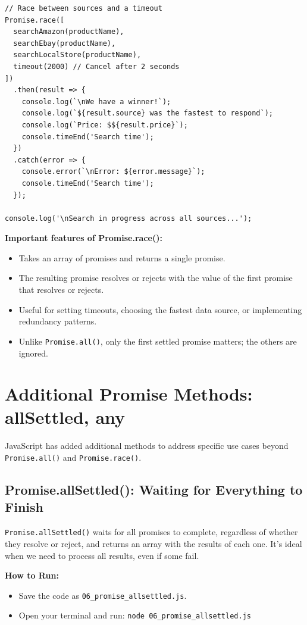 \documentclass[12pt,letterpaper]{article}
\newenvironment{macterminal}{%
    \begin{mdframed}[
        linecolor=terminalFrame,
        backgroundcolor=terminalBg,
        roundcorner=5pt,
        skipabove=5pt,
        skipbelow=5pt,
        linewidth=1pt,
        innertopmargin=5pt,
        frametitle={%
            \tikz[baseline=(current bounding box.east), outer sep=0pt]{
                \fill[red!80!black] (0,0) circle (5pt);
                \fill[yellow!80!black] (0.7,0) circle (5pt);
                \fill[green!70!black] (1.4,0) circle (5pt);
            }
        },
        frametitlealignment=\raggedright,
        frametitleaboveskip=8pt,
        frametitlebelowskip=0pt,
    ]
}{%
    \end{mdframed}%
}
\begin{document}
\begin{macterminal}
\begin{lstlisting}
// Race between sources and a timeout
Promise.race([
  searchAmazon(productName),
  searchEbay(productName),
  searchLocalStore(productName),
  timeout(2000) // Cancel after 2 seconds
])
  .then(result => {
    console.log(`\nWe have a winner!`);
    console.log(`${result.source} was the fastest to respond`);
    console.log(`Price: $${result.price}`);
    console.timeEnd('Search time');
  })
  .catch(error => {
    console.error(`\nError: ${error.message}`);
    console.timeEnd('Search time');
  });

console.log('\nSearch in progress across all sources...');
\end{lstlisting}
\end{macterminal}

\textbf{Important features of Promise.race():}
\begin{itemize}
    \item Takes an array of promises and returns a single promise.
    \item The resulting promise resolves or rejects with the value of the first promise that resolves or rejects.
    \item Useful for setting timeouts, choosing the fastest data source, or implementing redundancy patterns.
    \item Unlike \texttt{\textcolor{accentColor}{Promise.all()}}, only the first settled promise matters; the others are ignored.
\end{itemize}

\section{Additional Promise Methods: allSettled, any}

JavaScript has added additional methods to address specific use cases beyond \texttt{\textcolor{accentColor}{Promise.all()}} and \texttt{\textcolor{accentColor}{Promise.race()}}.

\subsection{Promise.allSettled(): Waiting for Everything to Finish}

\texttt{\textcolor{accentColor}{Promise.allSettled()}} waits for all promises to complete, regardless of whether they resolve or reject, and returns an array with the results of each one. It's ideal when we need to process all results, even if some fail.

\textbf{How to Run:}
\begin{itemize}
    \item Save the code as \verb|06_promise_allsettled.js|.
    \item Open your terminal and run: \verb|node 06_promise_allsettled.js|
\end{itemize}
\end{document}
